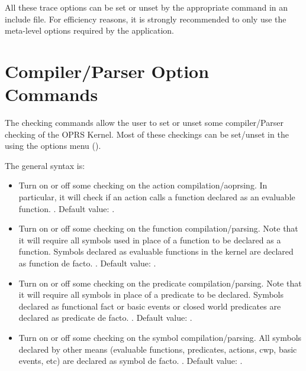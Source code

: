 All these trace options can be set or unset by the appropriate command in
an include file. For efficiency reasons, it is strongly recommended to only use the
meta-level options required by the application.

\section{\CPK{} Compiler/Parser Option Commands}

The checking commands allow the user to set or unset some compiler/Parser
checking of the OPRS Kernel. Most of these checkings can be set/unset in the
\XPK{} using the options menu ().

The general syntax is:


\begin{itemize}

\item {} Turn on or off some checking on the action
compilation/aoprsing. In particular, it will check if an action calls a function
declared as an evaluable function. . Default value:
.

\item {} Turn on or off some checking on the function
compilation/parsing. Note that it will require all symbols used in place of a
function to be declared as a function. Symbols declared as evaluable functions
in the kernel are declared as function de facto. . Default value: .

\item {} Turn on or off some checking on the predicate
compilation/parsing. Note that it will require all symbols in place of a
predicate to be declared. Symbols declared as functional fact or basic events or
closed world predicates are declared as predicate de facto. . Default value: .

\item {} Turn on or off some checking on the symbol
compilation/parsing. All symbols declared by other means (evaluable functions,
predicates, actions, cwp, basic events, etc) are declared as symbol de
facto. . Default value: .

\end{itemize}

